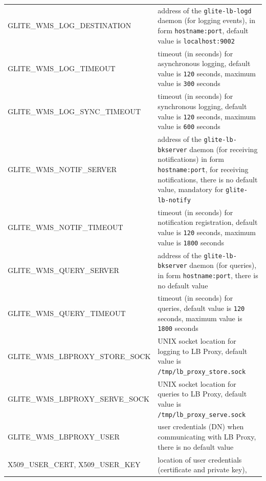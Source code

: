 \begin{tabularx}{\textwidth}{l>{\raggedright\arraybackslash}X}
GLITE\_WMS\_LOG\_DESTINATION & 
   address of the \texttt{glite-lb-logd} daemon (for logging events), 
   in form \texttt{hostname:port},
   default value is \texttt{localhost:9002}\\
GLITE\_WMS\_LOG\_TIMEOUT & 
   timeout (in seconds) for asynchronous logging, 
   default value is \texttt{120} seconds, 
   maximum value is \texttt{300} seconds \\
GLITE\_WMS\_LOG\_SYNC\_TIMEOUT & 
   timeout (in seconds) for synchronous logging, 
   default value is \texttt{120} seconds, 
   maximum value is \texttt{600} seconds \\
GLITE\_WMS\_NOTIF\_SERVER & 
   address of the \texttt{glite-lb-bkserver} daemon (for receiving notifications)
   in form \texttt{hostname:port}, for receiving notifications,
   there is no default value,
   mandatory for \texttt{glite-lb-notify} \\
GLITE\_WMS\_NOTIF\_TIMEOUT & 
   timeout (in seconds) for notification registration,
   default value is \texttt{120} seconds,
   maximum value is \texttt{1800} seconds \\
GLITE\_WMS\_QUERY\_SERVER & 
   address of the \texttt{glite-lb-bkserver} daemon (for queries), 
   in form \texttt{hostname:port}, 
   there is no default value \\
GLITE\_WMS\_QUERY\_TIMEOUT &
   timeout (in seconds) for queries,
   default value is \texttt{120} seconds,
   maximum value is \texttt{1800} seconds \\
GLITE\_WMS\_LBPROXY\_STORE\_SOCK &
   UNIX socket location for logging to LB Proxy,
   default value is \texttt{/tmp/lb\_proxy\_store.sock} \\
GLITE\_WMS\_LBPROXY\_SERVE\_SOCK &
   UNIX socket location for queries to LB Proxy,
   default value is \texttt{/tmp/lb\_proxy\_serve.sock} \\
GLITE\_WMS\_LBPROXY\_USER &
   user credentials (DN) when communicating with LB Proxy,  
   there is no default value \\
X509\_USER\_CERT, X509\_USER\_KEY & 
   location of user credentials (certificate and private key),

\end{tabularx}
